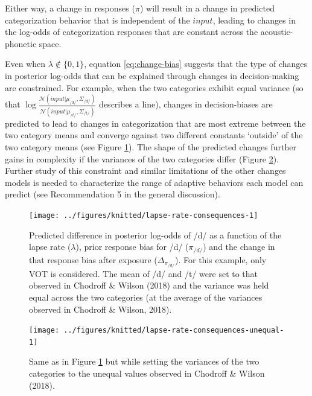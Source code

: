 \documentclass[
  11pt,
  man,floatsintext]{apa6}
\begin{document}
Either way, a change in responses (\(\pi\)) will result in a change in predicted categorization behavior that is independent of the \(input\), leading to changes in the log-odds of categorization responses that are constant across the acoustic-phonetic space.

Even when \(\lambda \not\in \{0,1\}\), equation \eqref{eq:change-bias} suggests that the type of changes in posterior log-odds that can be explained through changes in decision-making are constrained. For example, when the two categories exhibit equal variance (so that \(\log \frac{\mathcal{N}\!\left( input | \mu_{/d/}, \Sigma_{/d/} \right)}{\mathcal{N}\!\left( input | \mu_{/t/}, \Sigma_{/t/} \right)}\) describes a line), changes in decision-biases are predicted to lead to changes in categorization that are most extreme between the two category means and converge against two different constants `outside' of the two category means (see Figure \ref{fig:lapse-rate-consequences}). The shape of the predicted changes further gains in complexity if the variances of the two categories differ (Figure \ref{fig:lapse-rate-consequences-unequal}). Further study of this constraint and similar limitations of the other changes models is needed to characterize the range of adaptive behaviors each model can predict (see Recommendation 5 in the general discussion).



\begin{figure}

{\centering \texttt{[image: ../figures/knitted/lapse-rate-consequences-1]} 

}

\caption{Predicted difference in posterior log-odds of /d/ as a function of the lapse rate (\(\lambda\)), prior response bias for /d/ (\(\pi_{/d/}\)) and the change in that response bias after exposure (\(\Delta_{\pi_{/d/}}\)). For this example, only VOT is considered. The mean of /d/ and /t/ were set to that observed in Chodroff \& Wilson (2018) and the variance was held equal across the two categories (at the average of the variances observed in Chodroff \& Wilson, 2018).}\label{fig:lapse-rate-consequences}
\end{figure}



\begin{figure}

{\centering \texttt{[image: ../figures/knitted/lapse-rate-consequences-unequal-1]} 

}

\caption{Same as in Figure \ref{fig:lapse-rate-consequences} but while setting the variances of the two categories to the unequal values observed in Chodroff \& Wilson (2018).}\label{fig:lapse-rate-consequences-unequal}
\end{figure}
\end{document}
